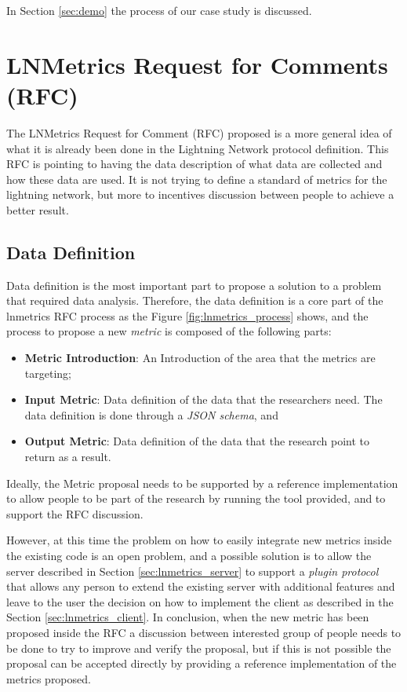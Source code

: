 In Section \ref{sec:demo} the process of our case study is discussed.

\section{LNMetrics Request for Comments (RFC)}

The LNMetrics Request for Comment (RFC) proposed is a more general idea of what 
it is already been done in the Lightning Network protocol definition. 
This RFC is pointing to having the data description of what data are collected 
and how these data are used. It is not trying to define a 
standard of metrics for the lightning network, 
but more to incentives discussion between people to achieve a better result.

\subsection{Data Definition}
\label{sec:data_definition}

Data definition is the most important part to propose a solution to a problem 
that required data analysis. Therefore, the data definition is a core 
part of the lnmetrics RFC process as the Figure \ref{fig:lnmetrics_process}
shows, and the process to propose a new \emph{metric} is composed of 
the following parts:

\begin{itemize}
    \item {\bf Metric Introduction}: An Introduction of the area that the metrics are targeting;
    \item {\bf Input Metric}: Data definition of the data that the researchers need. The data definition is done through a \emph{JSON schema}, and
    \item {\bf Output Metric}: Data definition of the data that the research point to return as a result. 
\end{itemize}

Ideally, the Metric proposal needs to be supported by a reference implementation to 
allow people to be part of the research by running the tool provided, and 
to support the RFC discussion.

However, at this time the problem on how to easily integrate new metrics inside the 
existing code is an open problem, and a possible solution is to allow the server 
described in Section \ref{sec:lnmetrics_server} to support a \emph{plugin protocol}
that allows any person to extend the existing server with additional features and leave to the user 
the decision on how to implement the client as described in the Section \ref{sec:lnmetrics_client}.
In conclusion, when the new metric has been proposed inside the RFC a discussion between interested 
group of people needs to be done to try to improve and verify the proposal, but if this is not possible
the proposal can be accepted directly by providing a reference implementation of the metrics proposed.

